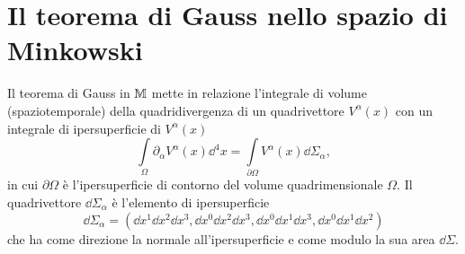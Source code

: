 \cleardoublepage
\chapter{Il teorema di Gauss nello spazio di Minkowski}
\label{cha:teorema-gauss}

Il teorema di Gauss in $\mathbb{M}$ mette in relazione
l'integrale di volume (spaziotemporale) della quadridivergenza di un
quadrivettore $V^{\alpha}(x)$ con un integrale di ipersuperficie di
$V^{\alpha}(x)$
\begin{equation}
  \int\limits_{\Omega} \partial_{\alpha}V^{\alpha}(x) \dd^{4} x =
  \int\limits_{\partial\Omega} V^{\alpha}(x) \dd\Sigma_{\alpha},
\end{equation}
in cui $\partial\Omega$ è l'ipersuperficie di contorno del volume
quadrimensionale $\Omega$. Il quadrivettore $\dd\Sigma_{\alpha}$ è l'elemento di
ipersuperficie
\begin{equation}
  \dd\Sigma_{\alpha} = (\dd x^{1}\dd x^{2}\dd x^{3}, \dd x^{0}\dd x^{2}\dd
  x^{3}, \dd x^{0}\dd x^{1}\dd x^{3}, \dd x^{0}\dd x^{1}\dd x^{2})
\end{equation}
che ha come direzione la normale all'ipersuperficie e come modulo la sua area
$\dd\Sigma$.

